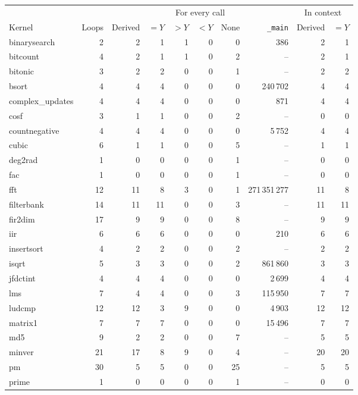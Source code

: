 \documentclass[oneside,english]{amsart}
\numberwithin{equation}{section}
\numberwithin{figure}{section}
\theoremstyle{plain}
\theoremstyle{definition}
\theoremstyle{plain}
\theoremstyle{remark}
\theoremstyle{plain}
\theoremstyle{definition}
\theoremstyle{plain}
\theoremstyle{remark}
\begin{document}
\begin{table}[ht]
\centering
\footnotesize
\setlength{\tabcolsep}{4pt}
\begin{tabular}{@{}lrrrrrrrrr@{}}
\toprule
 & & \multicolumn{6}{c}{For every call} & \multicolumn{2}{c}{In context} \\
\cmidrule(lr){3-8}\cmidrule(l){9-10}
Kernel & Loops & Derived & $= Y$ & $> Y$ & $< Y$ & None & \texttt{\_main} & Derived & $= Y$ \\
\midrule
binarysearch & 2 & 2 & 1 & 1 & 0 & 0 & 386 & 2 & 1 \\
bitcount & 4 & 2 & 1 & 1 & 0 & 2 & -- & 2 & 1 \\
bitonic & 3 & 2 & 2 & 0 & 0 & 1 & -- & 2 & 2 \\
bsort & 4 & 4 & 4 & 0 & 0 & 0 & 240\,702 & 4 & 4 \\
complex\_updates & 4 & 4 & 4 & 0 & 0 & 0 & 871 & 4 & 4 \\
cosf & 3 & 1 & 1 & 0 & 0 & 2 & -- & 0 & 0 \\
countnegative & 4 & 4 & 4 & 0 & 0 & 0 & 5\,752 & 4 & 4 \\
cubic & 6 & 1 & 1 & 0 & 0 & 5 & -- & 1 & 1 \\
deg2rad & 1 & 0 & 0 & 0 & 0 & 1 & -- & 0 & 0 \\
fac & 1 & 0 & 0 & 0 & 0 & 1 & -- & 0 & 0 \\
fft & 12 & 11 & 8 & 3 & 0 & 1 & 271\,351\,277 & 11 & 8 \\
filterbank & 14 & 11 & 11 & 0 & 0 & 3 & -- & 11 & 11 \\
fir2dim & 17 & 9 & 9 & 0 & 0 & 8 & -- & 9 & 9 \\
iir & 6 & 6 & 6 & 0 & 0 & 0 & 210 & 6 & 6 \\
insertsort & 4 & 2 & 2 & 0 & 0 & 2 & -- & 2 & 2 \\
isqrt & 5 & 3 & 3 & 0 & 0 & 2 & 861\,860 & 3 & 3 \\
jfdctint & 4 & 4 & 4 & 0 & 0 & 0 & 2\,699 & 4 & 4 \\
lms & 7 & 4 & 4 & 0 & 0 & 3 & 115\,950 & 7 & 7 \\
ludcmp & 12 & 12 & 3 & 9 & 0 & 0 & 4\,903 & 12 & 12 \\
matrix1 & 7 & 7 & 7 & 0 & 0 & 0 & 15\,496 & 7 & 7 \\
md5 & 9 & 2 & 2 & 0 & 0 & 7 & -- & 5 & 5 \\
minver & 21 & 17 & 8 & 9 & 0 & 4 & -- & 20 & 20 \\
pm & 30 & 5 & 5 & 0 & 0 & 25 & -- & 5 & 5 \\
prime & 1 & 0 & 0 & 0 & 0 & 1 & -- & 0 & 0 \\

\end{tabular}
\end{table}
\end{document}
